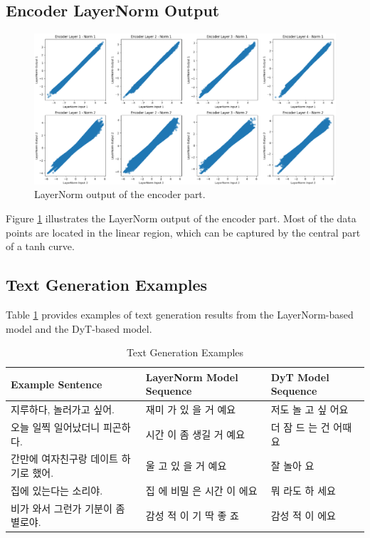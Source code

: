 \documentclass{article}
\begin{document}
\subsection{Encoder LayerNorm Output}

\begin{figure}[h!]
    \centering
    \includegraphics[width=1\textwidth]{figure_layernorm_encoder.png}
    \caption{LayerNorm output of the encoder part.}
    \label{fig:layernorm_encoder}
\end{figure}

Figure \ref{fig:layernorm_encoder} illustrates the LayerNorm output of the encoder part. Most of the data points are located in the linear region, which can be captured by the central part of a tanh curve.

\subsection{Text Generation Examples}

Table \ref{tab:text_generation_examples} provides examples of text generation results from the LayerNorm-based model and the DyT-based model.

\begin{center}
\begin{table}
\caption{Text Generation Examples}
\label{tab:text_generation_examples}
\begin{tabular}{llp{8cm}}
\toprule
Example Sentence & LayerNorm Model Sequence & DyT Model Sequence \\
\midrule
지루하다, 놀러가고 싶어. & 재미 가 있 을 거 예요 & 저도 놀 고 싶 어요 \\
오늘 일찍 일어났더니 피곤하다. & 시간 이 좀 생길 거 예요 & 더 잠 드 는 건 어때 요 \\
간만에 여자친구랑 데이트 하기로 했어. & 울 고 있 을 거 예요 & 잘 놀아 요 \\
집에 있는다는 소리야. & 집 에 비밀 은 시간 이 에요 & 뭐 라도 하 세요 \\
비가 와서 그런가 기분이 좀 별로야. & 감성 적 이 기 딱 좋 죠 & 감성 적 이 에요 \\
\bottomrule
\end{tabular}
\end{table}
\end{center}
\end{document}
